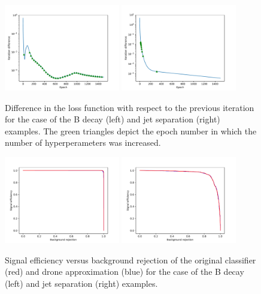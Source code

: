 \documentclass[final,5p,times,twocolumn]{elsarticle}
\begin{document}
\begin{figure}[t]
\centering
\includegraphics[width=0.45\textwidth]{diff_history}
\includegraphics[width=0.45\textwidth]{diff_history_gpd}
\caption{\small
Difference in the loss function with respect to the previous iteration
  for the case of the B
  decay (left) and jet separation (right) examples.
  The green triangles
depict the epoch number in which the number of hyperperameters was increased.
}
\label{fig:iterdiff}
\end{figure}
\begin{figure}[t]
\centering
\includegraphics[width=0.45\textwidth]{roc}
\includegraphics[width=0.45\textwidth]{roc_gpd}
\caption{\small
  Signal efficiency versus background rejection of the original classifier (red) and drone
  approximation (blue)
  for the case of the B
  decay (left) and jet separation (right) examples.
}
\label{fig:roc}
\end{figure}
\end{document}

